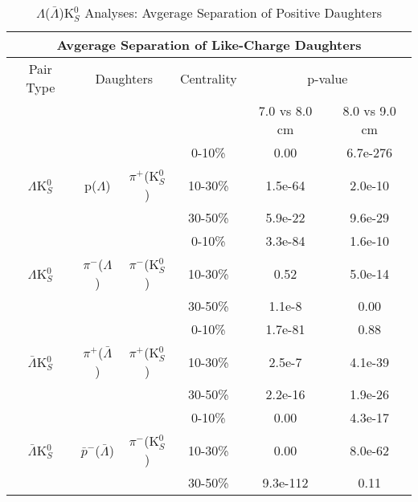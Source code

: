 \documentclass[../AnalysisNoteJBuxton.tex]{subfiles}
\begin{document}
\begin{table}
 \centering
 \begin{tabular}{|c|c|c|c|c|c|}
 \multicolumn{6}{c}{Avgerage Separation of Like-Charge Daughters} \\
  \hline
  Pair Type & \multicolumn{2}{|c|}{Daughters} & Centrality & \multicolumn{2}{c|}{p-value} \\
  \cline{5-6}
   & \multicolumn{2}{|c|}{} & & 7.0 vs 8.0 cm & 8.0 vs 9.0 cm \\
  \hline
   & & & 0-10\% & 0.00 & 6.7e-276 \\
  $\Lambda$K$^{0}_{S}$ & p($\Lambda$) & $\pi^{+}$(K$^{0}_{S}$) 
     & 10-30\% & 1.5e-64 & 2.0e-10 \\
   & & & 30-50\% & 5.9e-22 & 9.6e-29 \\
  \hline
   & & & 0-10\% & 3.3e-84 & 1.6e-10 \\
   $\Lambda$K$^{0}_{S}$ & $\pi^{-}$($\Lambda$) & $\pi^{-}$(K$^{0}_{S}$) 
     & 10-30\% & 0.52 & 5.0e-14 \\
   & & & 30-50\% & 1.1e-8 & 0.00 \\
  \hline \hline
   & & & 0-10\% & 1.7e-81 & 0.88 \\
   $\bar{\Lambda}$K$^{0}_{S}$ & $\pi^{+}$($\bar{\Lambda}$) & $\pi^{+}$(K$^{0}_{S}$) 
     & 10-30\% & 2.5e-7 & 4.1e-39 \\
   & & & 30-50\% & 2.2e-16 & 1.9e-26 \\
  \hline
   & & & 0-10\% & 0.00 & 4.3e-17 \\
   $\bar{\Lambda}$K$^{0}_{S}$ & $\bar{p}^{-}$($\bar{\Lambda}$) & $\pi^{-}$(K$^{0}_{S}$)
     & 10-30\% & 0.00 & 8.0e-62 \\
   & & & 30-50\% & 9.3e-112 & 0.11 \\
  \hline
 \end{tabular}
 \caption{$\Lambda$($\bar{\Lambda}$)K$^{0}_{S}$ Analyses: Avgerage Separation of Positive Daughters}
 \label{tab:AvgSepLamK0}
\end{table}
\end{document}
